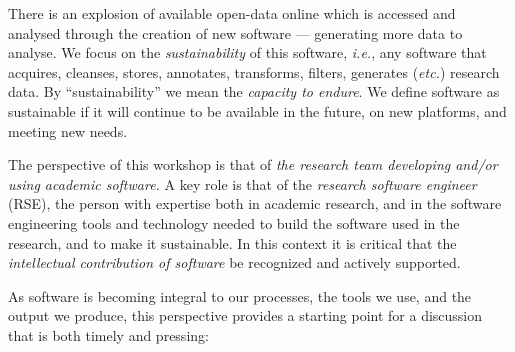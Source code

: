 \documentclass[a4paper,UKenglish]{dagman}
\newcommand{\ie}{\emph{i.e.},\xspace}
\newcommand{\etc}{\emph{etc.}\xspace}
\begin{document}
There is an explosion of available open-data online which is accessed and analysed through the creation of new software --- generating more data to analyse. We focus on the \emph{sustainability} of this software, \ie any software that acquires, cleanses, stores, annotates, transforms, filters, generates (\etc) research data.
By ``sustainability'' we mean the \emph{capacity to endure}. We define software as sustainable if it will continue to be available in the future, on new platforms, and meeting new needs. 
  


The perspective of this workshop is that of \emph{the research team developing and/or using academic software.} 
A key role is that of the \emph{research software engineer} (RSE), the person with expertise both in academic research, and in the software engineering tools and technology needed to build the software used in the research, and to make it sustainable. 
In this context it is critical that the \emph{intellectual contribution of software} be recognized and actively supported.

As software is becoming integral to our processes, the tools we use, and the output we produce, this perspective provides a starting point for a discussion that is both timely and pressing:
\end{document}
